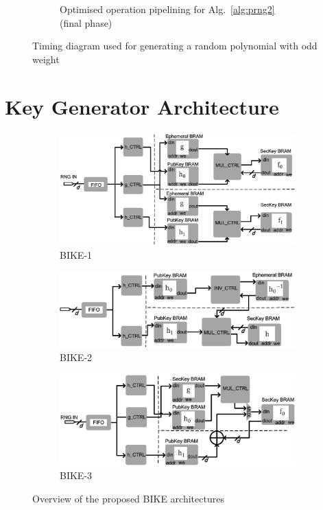 \documentclass[runningheads]{llncs}
\begin{document}
\begin{figure}[!tb]
\begin{subfigure}[t]{0.45\textwidth}
\caption{Optimised operation pipelining for Alg.~\ref{alg:prng2} (final phase) }
\label{fig:pipeline_rng3}
\end{subfigure}
\caption{Timing diagram used for generating a random polynomial with odd weight}
\end{figure}

\section{Key Generator Architecture}
\begin{figure}[!tb]
\centering
\begin{subfigure}[t]{0.47\textwidth}\centering
\includegraphics[width=\textwidth]{./fig/BIKE-1.eps}
\caption{BIKE-1}
\label{fig:bike1}
\end{subfigure}
\hspace{1em}
\begin{subfigure}[t]{0.47\textwidth}\centering
\includegraphics[width=\textwidth]{./fig/BIKE-2.eps}
\caption{BIKE-2 }
\label{fig:bike2}
\end{subfigure}
\begin{subfigure}[t]{0.47\textwidth}\centering
\includegraphics[width=\textwidth]{./fig/BIKE-3.eps}
\caption{BIKE-3 }
\label{fig:bike3}
\end{subfigure}
\caption{Overview of the proposed BIKE architectures}
\end{figure}
\end{document}
